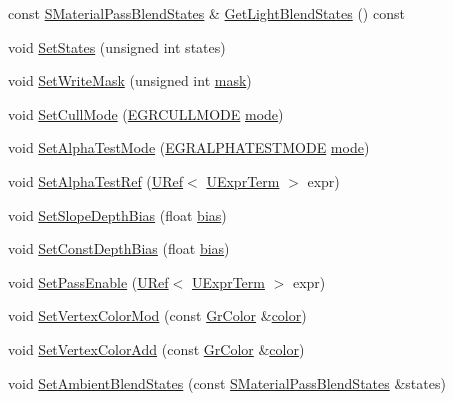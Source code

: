 \begin{CompactItemize}
\item 
const \hyperlink{struct_s_material_pass_blend_states}{SMaterialPassBlendStates} \& \hyperlink{class_gr_material_pass_cdf7d0d1244d270f8c68e7b8cf20bb14}{GetLightBlendStates} () const 
\item 
void \hyperlink{class_gr_material_pass_c0406c4ebc750d788d1d0c13f10e9203}{SetStates} (unsigned int states)
\item 
void \hyperlink{class_gr_material_pass_d4b4e6721ac85e8e66526390f0c08142}{SetWriteMask} (unsigned int \hyperlink{glext__bak_8h_5612bf87afe1aa200ad412866de45c1f}{mask})
\item 
void \hyperlink{class_gr_material_pass_8c69d8f73a4a4742661c28d33c62d5c5}{SetCullMode} (\hyperlink{_gr_util_8h_ea790ef067767354691d0d60c51542fe}{EGRCULLMODE} \hyperlink{glext__bak_8h_1e71d9c196e4683cc06c4b54d53f7ef5}{mode})
\item 
void \hyperlink{class_gr_material_pass_e274892d545d45e5b1814f3752cc9b63}{SetAlphaTestMode} (\hyperlink{_gr_util_8h_abff98128b1f220d1ceff538f4abdef3}{EGRALPHATESTMODE} \hyperlink{glext__bak_8h_1e71d9c196e4683cc06c4b54d53f7ef5}{mode})
\item 
void \hyperlink{class_gr_material_pass_a1d660422bfd38ecb23256ca4abf1239}{SetAlphaTestRef} (\hyperlink{class_u_ref}{URef}$<$ \hyperlink{class_u_expr_term}{UExprTerm} $>$ expr)
\item 
void \hyperlink{class_gr_material_pass_ffa472b516c906654ce2b807fa757ba4}{SetSlopeDepthBias} (float \hyperlink{glext__bak_8h_39c3ffa18f420251c5d132dd8c1c6137}{bias})
\item 
void \hyperlink{class_gr_material_pass_9803fdd3bec657d410491f8b43a3a21e}{SetConstDepthBias} (float \hyperlink{glext__bak_8h_39c3ffa18f420251c5d132dd8c1c6137}{bias})
\item 
void \hyperlink{class_gr_material_pass_ed26f0584038d1f297755fbfebd6e078}{SetPassEnable} (\hyperlink{class_u_ref}{URef}$<$ \hyperlink{class_u_expr_term}{UExprTerm} $>$ expr)
\item 
void \hyperlink{class_gr_material_pass_3d22971b4cf68d16b982992fcb0a646a}{SetVertexColorMod} (const \hyperlink{class_gr_color}{GrColor} \&\hyperlink{glext_8h_3ea846f998d64f079b86052b6c4193a8}{color})
\item 
void \hyperlink{class_gr_material_pass_e06601541c21e3d6669d5df0e82c57a1}{SetVertexColorAdd} (const \hyperlink{class_gr_color}{GrColor} \&\hyperlink{glext_8h_3ea846f998d64f079b86052b6c4193a8}{color})
\item 
void \hyperlink{class_gr_material_pass_d52b02b6e3e016f47b15fe62d834531c}{SetAmbientBlendStates} (const \hyperlink{struct_s_material_pass_blend_states}{SMaterialPassBlendStates} \&states)

\end{CompactItemize}
